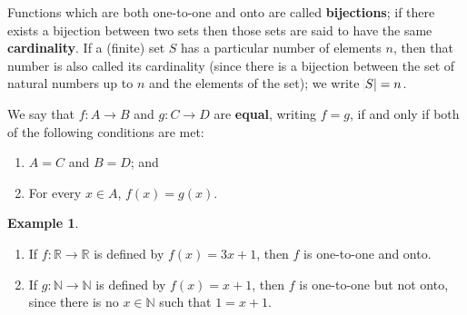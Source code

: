 \documentclass[a4paper,leqno]{article}
\numberwithin{equation}{section}
\theoremstyle{definition}
\newtheorem{ex}[equation]{Example}
\theoremstyle{remark}
\newcommand{\df}[1]{\textbf{#1}}
\begin{document}
Functions which are both one-to-one and onto are called \df{bijections}; if there exists a bijection between two sets then those
sets are said to have the same \df{cardinality}. If a (finite) set $ S $ has a particular number of elements $ n $, then that number is also
called its cardinality (since there is a bijection between the set of natural numbers up to $ n $ and the elements of the set); we write $ \abs{S} = n $.

We say that $ f : A \to B $ and $ g : C \to D $ are \df{equal}, writing $ f = g $, if and only if both of the following conditions are met:
\begin{enumerate}
  \item $ A = C $ and $ B = D $; and
  \item For every $ x \in A $, $ f(x) = g(x) $.
\end{enumerate}

\begin{ex}\leavevmode
  \begin{enumerate}
    \item If $ f : \mathbb{R} \to \mathbb{R} $ is defined by $ f(x) = 3x + 1 $, then $ f $ is one-to-one and onto.
    \item If $ g : \mathbb{N} \to \mathbb{N} $ is defined by $ f(x) = x + 1 $, then $ f $ is one-to-one but not onto, since there is no $ x \in \mathbb{N} $
          such that $ 1 = x + 1 $.
  \end{enumerate}
\end{ex}
\end{document}
